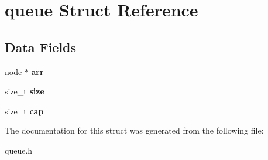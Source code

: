 \hypertarget{structqueue}{}\section{queue Struct Reference}
\label{structqueue}
\subsection*{Data Fields}
\begin{DoxyCompactItemize}
\item 
\hypertarget{structqueue_ab5ce5e34bbaa83b0b7c548f31d926302}{}\hyperlink{structnode__t}{node} $\ast$ {\bfseries arr}\label{structqueue_ab5ce5e34bbaa83b0b7c548f31d926302}

\item 
\hypertarget{structqueue_a897cfd3fc12480bee3488fa908082a77}{}size\+\_\+t {\bfseries size}\label{structqueue_a897cfd3fc12480bee3488fa908082a77}

\item 
\hypertarget{structqueue_ac87392c867b092d5cd96ed1b448f9eb3}{}size\+\_\+t {\bfseries cap}\label{structqueue_ac87392c867b092d5cd96ed1b448f9eb3}

\end{DoxyCompactItemize}


The documentation for this struct was generated from the following file\+:\begin{DoxyCompactItemize}
\item 
queue.\+h\end{DoxyCompactItemize}
